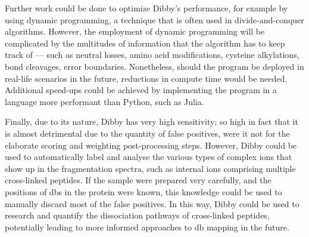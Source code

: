 Further work could be done to optimize Dibby's performance, for example by using dynamic programming, a technique that is often used in divide-and-conquer algorithms. However, the employment of dynamic programming will be complicated by the multitudes of information that the algorithm has to keep track of --- such as neutral losses, amino acid modifications, cysteine alkylations, bond cleavages, error boundaries. Nonetheless, should the program be deployed in real-life scenarios in the future, reductions in compute time would be needed. Additional speed-ups could be achieved by implementing the program in a language more performant than Python, such as Julia.

Finally, due to its nature, Dibby has very high sensitivity; so high in fact that it is almost detrimental due to the quantity of false positives, were it not for the elaborate scoring and weighting post-processing steps. However, Dibby could be used to automatically label and analyse the various types of complex ions that show up in the fragmentation spectra, such as internal ions comprising multiple cross-linked peptides. If the sample were prepared very carefully, and the positions of \glspl*{db} in the protein were known, this knowledge could be used to manually discard most of the false positives. In this way, Dibby could be used to research and quantify the dissociation pathways of cross-linked peptides, potentially leading to more informed approaches to \gls*{db} mapping in the future.